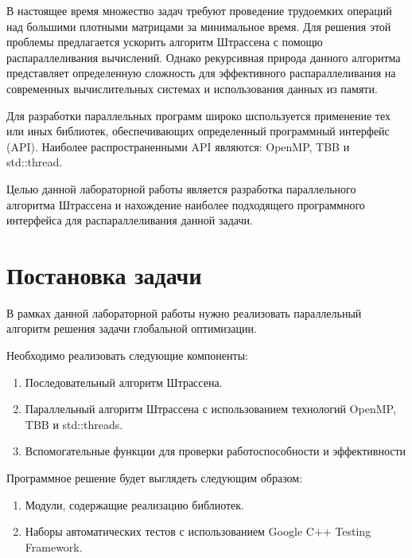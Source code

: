 \documentclass{article}
\begin{document}
\par В настоящее время множество задач требуют проведение трудоемких операций над большими плотными матрицами за минимальное время.  Для решения этой проблемы предлагается ускорить алгоритм Штрассена с помощю распараллеливания вычислений. Однако рекурсивная природа данного алгоритма представляет определенную сложность для эффективного распараллеливания на современных вычислительных системах и использования данных из памяти.

\par Для разработки параллельных программ широко шспользуется применение тех или иных библиотек, обеспечивающих определенный программный интерфейс (API). Наиболее распространенными API являются: OpenMP, TBB и std::thread. 

\par Целью данной лабораторной работы является разработка параллельного алгоритма Штрассена и нахождение наиболее подходящего программного интерфейса для распараллеливания данной задачи.

\newpage

\section{Постановка задачи}
В рамках данной лабораторной работы нужно реализовать параллельный алгоритм решения задачи глобальной оптимизации.

\par Необходимо реализовать следующие компоненты:
 
\begin{enumerate}
\item Последовательный алгоритм Штрассена.
\item Параллельный алгоритм Штрассена с использованием технологий OpenMP, TBB и std::threads.
\item Вспомогательные функции для проверки работоспособности и эффективности
\end{enumerate}

\par Программное решение будет выглядеть следующим образом: 
 
\begin{enumerate}
\item Модули, содержащие реализацию библиотек. 
\item Наборы автоматических тестов с использованием Google C++ Testing Framework.
\end{enumerate}
\end{document}
